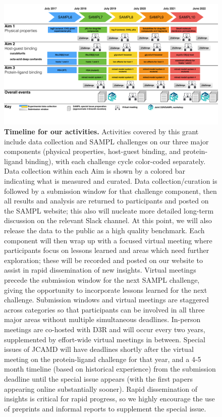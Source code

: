 \documentclass[11pt]{article}
\begin{document}
\begin{figure}[h]
\vspace{-0.10in}
\begin{centering}
\includegraphics[width=\textwidth]{figures/Timeline2_cropped.pdf}
\end{centering}
\vspace{-0.25in}
\caption{\footnotesize {\bf Timeline for our activities.} Activities covered by this grant include data collection and SAMPL challenges on our three major components (physical properties, host-guest binding, and protein-ligand binding), with each challenge cycle color-coded separately.  
Data collection within each Aim is shown by a colored bar indicating what is measured and curated.
Data collection/curation is followed by a submission window for that challenge component, then all results and analysis are returned to participants and posted on the SAMPL website; this also will nucleate more detailed long-term discussion on the relevant Slack channel.
At this point, we will also release the data to the public as a high quality benchmark.
Each component will then wrap up with a focused virtual meeting where participants focus on lessons learned and areas which need further exploration; these will be recorded and posted on our website to assist in rapid dissemination of new insights. 
Virtual meetings precede the submission window for the next SAMPL challenge, giving the opportunity to incorporate lessons learned for the next challenge.
Submission windows and virtual meetings are staggered across categories so that participants can be involved in all three major areas without multiple simultaneous deadlines.
In-person meetings are co-hosted with D3R and will occur every two years, supplemented by effort-wide virtual meetings in between.
Special issues of JCAMD will have deadlines shortly after the virtual meeting on the protein-ligand challenge for that year, and a 4-5 month timeline (based on historical experience) from the submission deadline until the special issue appears (with the first papers appearing online substantially sooner).
Rapid dissemination of insights is critical for rapid progress, so we highly encourage the use of preprints and informal reports to supplement the special issue.
\vspace{-0.1in}
\label{figure:timeline}}
\end{figure}
\end{document}
